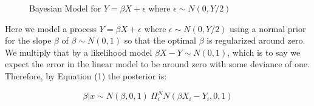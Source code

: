 \documentclass[12pt]{article}
\begin{document}
\begin{figure}[h]
\centering
{}
\hspace{1cm}

\hspace{1cm}
\caption{Bayesian Model for $Y = \beta X + \epsilon$ where $\epsilon \sim N(0,Y/2)$}
\end{figure}

\vspace{5mm}

Here we model a process $Y = \beta X + \epsilon$ where $\epsilon \sim N(0,Y/2)$ using a normal prior for the slope $\beta$ of $\beta \sim N(0,1)$ so that the optimal $\beta$ is regularized around zero. We multiply that by a likelihood model $\beta X - Y \sim N(0,1)$, which is to say we expect the error in the linear model to be around zero with some deviance of one. Therefore, by Equation (1) the posterior is:

\begin{equation}
\beta | x \sim N(\beta,0,1) \: \Pi_i^N N(\beta X_i - Y_i,0,1)
\end{equation}
\end{document}
